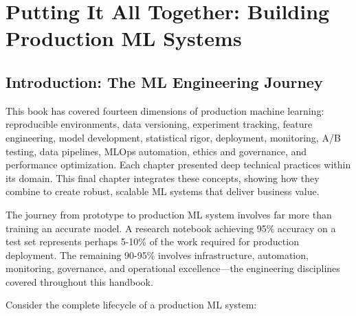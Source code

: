 \chapter{Putting It All Together: Building Production ML Systems}

\section{Introduction: The ML Engineering Journey}

This book has covered fourteen dimensions of production machine learning: reproducible environments, data versioning, experiment tracking, feature engineering, model development, statistical rigor, deployment, monitoring, A/B testing, data pipelines, MLOps automation, ethics and governance, and performance optimization. Each chapter presented deep technical practices within its domain. This final chapter integrates these concepts, showing how they combine to create robust, scalable ML systems that deliver business value.

The journey from prototype to production ML system involves far more than training an accurate model. A research notebook achieving 95\% accuracy on a test set represents perhaps 5-10\% of the work required for production deployment. The remaining 90-95\% involves infrastructure, automation, monitoring, governance, and operational excellence---the engineering disciplines covered throughout this handbook.

Consider the complete lifecycle of a production ML system:

